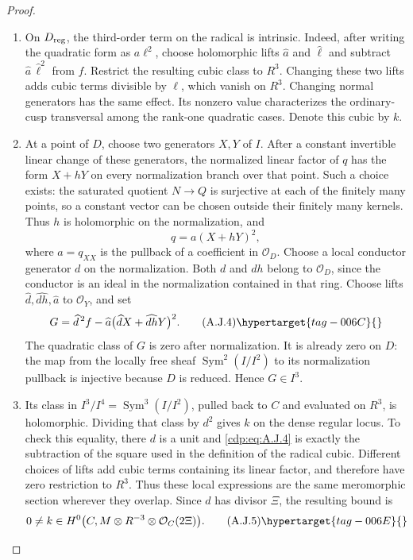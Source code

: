 \begin{proof}
\begin{enumerate}[label=\arabic*.,leftmargin=*]
\item On $D_{\rm reg}$, the third-order term on the radical is
intrinsic. Indeed, after writing the quadratic form as
$a\ell^2$, choose holomorphic lifts $\widehat a$ and $\widehat\ell$
and subtract $\widehat a\,\widehat\ell^2$ from $f$.
Restrict the resulting cubic class to $R^3$. Changing these two lifts
adds cubic terms divisible by $\ell$, which vanish on $R^3$.
Changing normal generators has the same effect. Its nonzero
value characterizes the ordinary-cusp transversal among the
rank-one quadratic cases. Denote this cubic by $k$.

\item At a point of $D$, choose two generators $X,Y$ of $I$. After a constant invertible linear
change of these generators, the normalized linear factor of
$q$ has the form $X+hY$ on every normalization branch over
that point. Such a choice exists: the saturated quotient
$N\to Q$ is surjective at each of the finitely many points,
so a constant vector can be chosen outside their finitely
many kernels. Thus $h$ is holomorphic on the normalization,
and
\[
 q=a(X+hY)^2,
\]
where $a=q_{XX}$ is the pullback of a coefficient
in $\mathcal O_D$. Choose a local conductor generator $d$
on the normalization. Both $d$ and $dh$ belong to
$\mathcal O_D$, since the conductor is an ideal in the
normalization contained in that ring. Choose lifts
$\widehat d,\widehat{dh},\widehat a$ to $\mathcal O_Y$,
and set
\[
 G=\widehat d^{\,2} f-
    \widehat a\bigl(\widehat d X+\widehat{dh}Y\bigr)^2.
                                                        \tag{A.J.4}\hypertarget{tag-006C}{}\label{cdp:eq:A.J.4}
\]
The quadratic class of $G$ is zero after normalization.
It is already zero on $D$: the map from the locally free
sheaf $\operatorname{Sym}^2(I/I^2)$ to its normalization
pullback is injective because $D$ is reduced. Hence
$G\in I^3$.

\item Its class in $I^3/I^4=\operatorname{Sym}^3(I/I^2)$,
pulled back to $C$ and evaluated on $R^3$, is holomorphic.
Dividing that class by $d^2$ gives $k$ on the dense regular
locus. To check this equality, there $d$ is a unit and
\eqref{cdp:eq:A.J.4} is exactly the subtraction of the square used in the
definition of the radical cubic. Different choices of lifts
add cubic terms containing its linear factor, and therefore
have zero restriction to $R^3$. Thus these local expressions
are the same meromorphic section wherever they overlap.
Since $d$ has divisor $\Xi$, the resulting bound is
\[
 0\ne k\in H^0\bigl(C,M\otimes R^{-3}
                               \otimes\mathcal O_C(2\Xi)\bigr).
                                                        \tag{A.J.5}\hypertarget{tag-006E}{}\label{cdp:eq:A.J.5}
\]


\end{enumerate}
\end{proof}
